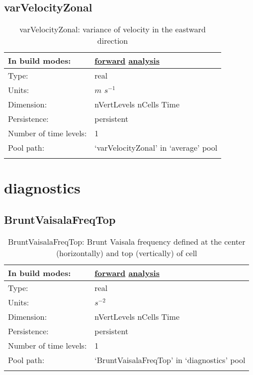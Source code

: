\subsection[varVelocityZonal]{varVelocityZonal}
\label{subsec:var_sec_average_varVelocityZonal}
\begin{center}
\begin{longtable}{| p{2.0in} | p{4.0in} |}
        \hline 
        In build modes: & \hyperref[subsec:forward_var_tab_average]{forward} \hyperref[subsec:analysis_var_tab_average]{analysis} \\
        \hline 
        Type: & real \\
        \hline 
        Units: & $m$ $s^{-1}$ \\
        \hline 
        Dimension: & nVertLevels nCells Time \\
        \hline 
        Persistence: & persistent \\
        \hline 
        Number of time levels: & 1 \\
        \hline 
            Pool path: & `varVelocityZonal' in `average' pool \\
		 \hline 
    \caption{varVelocityZonal: variance of velocity in the eastward direction}
\end{longtable}
\end{center}
\section[diagnostics]{diagnostics}
\label{sec:var_sec_diagnostics}
\subsection[BruntVaisalaFreqTop]{BruntVaisalaFreqTop}
\label{subsec:var_sec_diagnostics_BruntVaisalaFreqTop}
\begin{center}
\begin{longtable}{| p{2.0in} | p{4.0in} |}
        \hline 
        In build modes: & \hyperref[subsec:forward_var_tab_diagnostics]{forward} \hyperref[subsec:analysis_var_tab_diagnostics]{analysis} \\
        \hline 
        Type: & real \\
        \hline 
        Units: & $s^{-2}$ \\
        \hline 
        Dimension: & nVertLevels nCells Time \\
        \hline 
        Persistence: & persistent \\
        \hline 
        Number of time levels: & 1 \\
        \hline 
            Pool path: & `BruntVaisalaFreqTop' in `diagnostics' pool \\
		 \hline 
    \caption{BruntVaisalaFreqTop: Brunt Vaisala frequency defined at the center (horizontally) and top (vertically) of cell}
\end{longtable}
\end{center}

